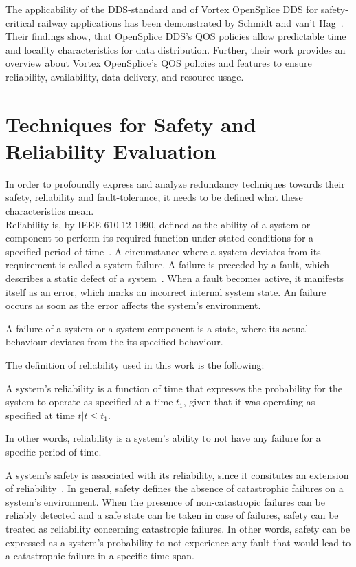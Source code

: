 The applicability of the \gls*{DDS}-standard and of Vortex OpenSplice \gls*{DDS} for safety-critical railway applications has been demonstrated by Schmidt and van't Hag~\cite{SchmidtMissionCriticalChallenges}.
Their findings show, that OpenSplice \gls*{DDS}'s \gls*{QOS} policies allow predictable time and locality characteristics for data distribution.
Further, their work provides an overview about Vortex OpenSplice's \gls*{QOS} policies and features to ensure reliability, availability, data-delivery, and resource usage.

\section{Techniques for Safety and Reliability Evaluation}
\label{sec:techniquesSafetyReliability}
In order to profoundly express and analyze redundancy techniques towards their safety, reliability and fault-tolerance, it needs to be defined what these characteristics mean.
\\

Reliability is, by IEEE 610.12-1990, defined as the ability of a system or component to perform its required function under stated conditions for a specified period of time~\cite{ieee610.12}.
A circumstance where a system deviates from its requirement is called a system failure.
A failure is preceded by a fault, which describes a static defect of a system~\cite{AmmannOffutt2016}.
When a fault becomes active, it manifests itself as an error, which marks an incorrect internal system state.
An failure occurs as soon as the error affects the system's environment.

\begin{definition}
A failure of a system or a system component is a state, where its actual behaviour deviates from the its specified behaviour.
\end{definition}

The definition of reliability used in this work is the following:

\begin{definition}
A system's reliability is a function of time that expresses the probability for the system to operate as specified at a time $t_1$, given that it was operating as specified at time $t | t \leq t_1$.
\end{definition}

In other words, reliability is a system's ability to not have any failure for a specific period of time.

A system's safety is associated with its reliability, since it consitutes an extension of reliability~\cite{AvizienisDependability2001}.
In general, safety defines the absence of catastrophic failures on a system's environment.
When the presence of non-catastropic failures can be reliably detected and a safe state can be taken in case of failures, safety can be treated as reliability concerning catastropic failures.
In other words, safety can be expressed as a system's probability to not experience any fault that would lead to a catastrophic failure in a specific time span.

